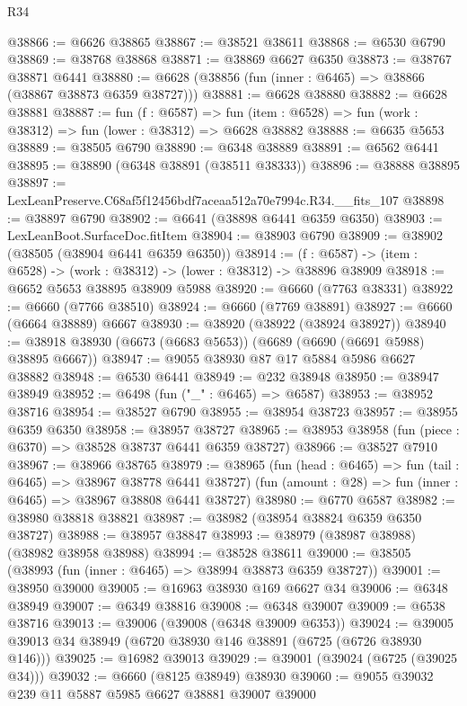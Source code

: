 \begin{lexlean}{R34}
\begin{coremodule}
@38866 := @6626 @38865
@38867 := @38521 @38611
@38868 := @6530 @6790
@38869 := @38768 @38868
@38871 := @38869 @6627 @6350
@38873 := @38767 @38871 @6441
@38880 := @6628 (@38856 (fun (inner : @6465) => @38866 (@38867 @38873 @6359 @38727)))
@38881 := @6628 @38880
@38882 := @6628 @38881
@38887 := fun (f : @6587) =>
  fun (item : @6528) => fun (work : @38312) => fun (lower : @38312) => @6628 @38882
@38888 := @6635 @5653
@38889 := @38505 @6790
@38890 := @6348 @38889
@38891 := @6562 @6441
@38895 := @38890 (@6348 @38891 (@38511 @38333))
@38896 := @38888 @38895
@38897 := LexLeanPreserve.C68af5f12456bdf7aceaa512a70e7994c.R34.__fits_107
@38898 := @38897 @6790
@38902 := @6641 (@38898 @6441 @6359 @6350)
@38903 := LexLeanBoot.SurfaceDoc.fitItem
@38904 := @38903 @6790
@38909 := @38902 (@38505 (@38904 @6441 @6359 @6350))
@38914 := (f : @6587) -> (item : @6528) -> (work : @38312) -> (lower : @38312) -> @38896 @38909
@38918 := @6652 @5653 @38895 @38909 @5988
@38920 := @6660 (@7763 @38331)
@38922 := @6660 (@7766 @38510)
@38924 := @6660 (@7769 @38891)
@38927 := @6660 (@6664 @38889) @6667
@38930 := @38920 (@38922 (@38924 @38927))
@38940 := @38918 @38930 (@6673 (@6683 @5653)) (@6689 (@6690 (@6691 @5988) @38895 @6667))
@38947 := @9055 @38930 @87 @17 @5884 @5986 @6627 @38882
@38948 := @6530 @6441
@38949 := @232 @38948
@38950 := @38947 @38949
@38952 := @6498 (fun ("_" : @6465) => @6587)
@38953 := @38952 @38716
@38954 := @38527 @6790
@38955 := @38954 @38723
@38957 := @38955 @6359 @6350
@38958 := @38957 @38727
@38965 := @38953 @38958 (fun (piece : @6370) => @38528 @38737 @6441 @6359 @38727)
@38966 := @38527 @7910
@38967 := @38966 @38765
@38979 := @38965
    (fun (head : @6465) => fun (tail : @6465) => @38967 @38778 @6441 @38727)
    (fun (amount : @28) => fun (inner : @6465) => @38967 @38808 @6441 @38727)
@38980 := @6770 @6587
@38982 := @38980 @38818 @38821
@38987 := @38982 (@38954 @38824 @6359 @6350 @38727)
@38988 := @38957 @38847
@38993 := @38979 (@38987 @38988) (@38982 @38958 @38988)
@38994 := @38528 @38611
@39000 := @38505 (@38993 (fun (inner : @6465) => @38994 @38873 @6359 @38727))
@39001 := @38950 @39000
@39005 := @16963 @38930 @169 @6627 @34
@39006 := @6348 @38949
@39007 := @6349 @38816
@39008 := @6348 @39007
@39009 := @6538 @38716
@39013 := @39006 (@39008 (@6348 @39009 @6353))
@39024 := @39005 @39013 @34 @38949 (@6720 @38930 @146 @38891 (@6725 (@6726 @38930 @146)))
@39025 := @16982 @39013
@39029 := @39001 (@39024 (@6725 (@39025 @34)))
@39032 := @6660 (@8125 @38949) @38930
@39060 := @9055
    @39032
    @239
    @11
    @5887
    @5985
    @6627
    @38881
    @39007
    @39000

\end{coremodule}
\end{lexlean}

